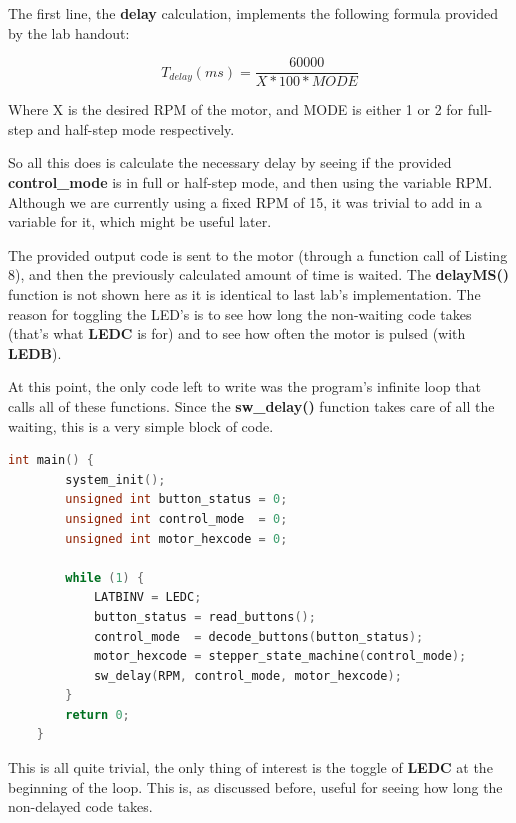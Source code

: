 \documentclass[a4paper, 12pt]{article}
\begin{document}
The first line, the \textbf{delay} calculation, implements the following formula provided by the lab handout:

$$T_{delay} (ms)=\frac{60000}{X * 100 * MODE}$$

Where X is the desired RPM of the motor, and MODE is either 1 or 2 for full-step and half-step mode respectively.

So all this does is calculate the necessary delay by seeing if the provided \textbf{control\_mode} is in full or half-step mode, and then using the variable RPM. Although we are currently using a fixed RPM of 15, it was trivial to add in a variable for it, which might be useful later.

The provided output code is sent to the motor (through a function call of Listing 8), and then the previously calculated amount of time is waited. The \textbf{delayMS()} function is not shown here as it is identical to last lab's implementation. The reason for toggling the LED's is to see how long the non-waiting code takes (that's what \textbf{LEDC} is for) and to see how often the motor is pulsed (with \textbf{LEDB}).

At this point, the only code left to write was the program's infinite loop that calls all of these functions. Since the \textbf{sw\_delay()} function takes care of all the waiting, this is a very simple block of code.

	\begin{mdframed}[backgroundcolor=code-gray, roundcorner=10pt,
								innerleftmargin=5, innertopmargin=5, innerbottommargin=5]	
	\begin{lstlisting}[language=C, caption=Infinite Program Loop, tabsize=2]
	int main() {
		system_init();
		unsigned int button_status = 0;
		unsigned int control_mode  = 0;
		unsigned int motor_hexcode = 0;
	
		while (1) {
			LATBINV = LEDC;
			button_status = read_buttons();	
			control_mode  = decode_buttons(button_status);
			motor_hexcode = stepper_state_machine(control_mode);
			sw_delay(RPM, control_mode, motor_hexcode);	
		}
		return 0;
	}
	\end{lstlisting}
	\end{mdframed}
	
This is all quite trivial, the only thing of interest is the toggle of \textbf{LEDC} at the beginning of the loop. This is, as discussed before, useful for seeing how long the non-delayed code takes.
\end{document}
